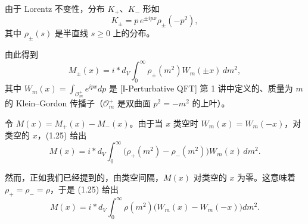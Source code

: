 由于 Lorentz 不变性，分布 $K_+$、$K_-$ 形如
\begin{equation}
  \tag{1.24}
  \label{eq:1-24}
  K_\pm=p\,e^{\pm ipx}\rho_\pm(-p^2),
\end{equation}
其中 $\rho_\pm(s)$ 是半直线 $s\ge0$ 上的分布。



由此得到
\begin{equation}
  \tag{1.25}
  \label{eq:1-25}
  M_\pm(x)=i*d_V\int_0^\infty\rho_\pm(m^2)W_m(\pm x)\,dm^2,
\end{equation}
其中 $W_m(x)=\int_{\mathcal{O}^+_m}e^{ipx}dp$ 是 [I-Perturbative QFT] 第 1 讲中定义的、质量为 $m$ 的 Klein–Gordon 传播子（$\mathcal{O}^+_m$ 是双曲面 $p^2=-m^2$ 的上叶）。

令 $M(x)=M_+(x)-M_-(x)$。由于当 $x$ 类空时 $W_m(x)=W_m(-x)$，对类空的 $x$，(1.25) 给出
\begin{equation}
  \tag{1.26}
  \label{eq:1-26}
  M(x)=i*d_V\int_0^\infty\bigl(\rho_+(m^2)-\rho_-(m^2)\bigr)W_m(x)\,dm^2.
\end{equation}

然而，正如我们已经提到的，由类空间隔，$M(x)$ 对类空的 $x$ 为零。这意味着 $\rho_+=\rho_-=\rho$，于是 (1.25) 给出
\begin{equation}
  \tag{1.27}
  \label{eq:1-27}
  M(x)=i*d_V\int_0^\infty\rho(m^2)\bigl(W_m(x)-W_m(-x)\bigr)dm^2.
\end{equation}

